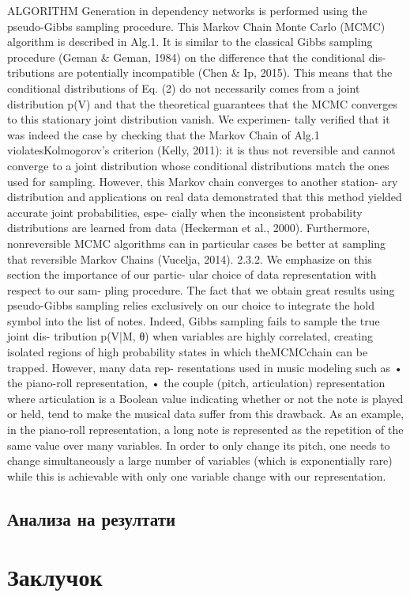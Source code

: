 \cite{Hadjeres2016} ALGORITHM Generation in dependency networks is performed using the pseudo-Gibbs sampling procedure. This Markov Chain Monte Carlo (MCMC) algorithm is described in Alg.1. It is similar to the classical Gibbs sampling procedure (Geman & Geman, 1984) on the difference that the conditional dis- tributions are potentially incompatible (Chen & Ip, 2015). This means that the conditional distributions of Eq. (2) do not necessarily comes from a joint distribution p(V) and that the theoretical guarantees that the MCMC converges to this stationary joint distribution vanish. We experimen- tally verified that it was indeed the case by checking that the Markov Chain of Alg.1 violatesKolmogorov’s criterion (Kelly, 2011): it is thus not reversible and cannot converge to a joint distribution whose conditional distributions match the ones used for sampling. However, this Markov chain converges to another station- ary distribution and applications on real data demonstrated that this method yielded accurate joint probabilities, espe- cially when the inconsistent probability distributions are learned from data (Heckerman et al., 2000). Furthermore, nonreversible MCMC algorithms can in particular cases be better at sampling that reversible Markov Chains (Vucelja, 2014). 2.3.2. We emphasize on this section the importance of our partic- ular choice of data representation with respect to our sam- pling procedure. The fact that we obtain great results using pseudo-Gibbs sampling relies exclusively on our choice to integrate the hold symbol into the list of notes. Indeed, Gibbs sampling fails to sample the true joint dis-
tribution p(V|M, θ) when variables are highly correlated, creating isolated regions of high probability states in which theMCMCchain can be trapped. However, many data rep- resentations used in music modeling such as
• the piano-roll representation,
• the couple (pitch, articulation) representation where articulation is a Boolean value indicating whether or not the note is played or held,
tend to make the musical data suffer from this drawback.
As an example, in the piano-roll representation, a long note is represented as the repetition of the same value over many variables. In order to only change its pitch, one needs to change simultaneously a large number of variables (which is exponentially rare) while this is achievable with only one variable change with our representation.

\section{Анализа на резултати}

\chapter{Заклучок}
\label{ch:zaklucok}